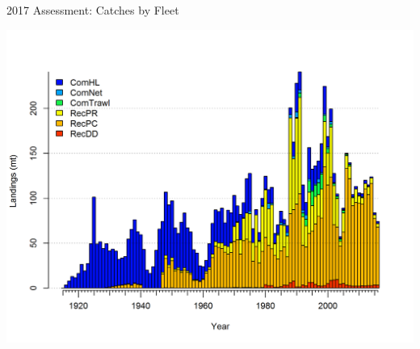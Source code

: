 \documentclass[ignorenonframetext,]{beamer}
\def\endcol{\end{column}}
\def\endcols{\end{columns}}
\begin{document}

\begin{frame}{2017 Assessment: Catches by Fleet}

\centering
\includegraphics{r4ss/plots_mod1/catch2 landings stacked.png}

\end{frame}
\end{document}
